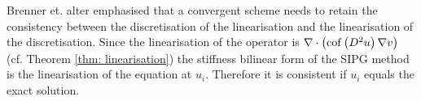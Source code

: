 Brenner et. alter emphasised that a convergent scheme needs to retain the consistency between the discretisation of the linearisation and the linearisation of the discretisation. Since the linearisation of the \MA operator is $\nabla \cdot \left( \operatorname{cof} \left( D^2 u \right) \nabla v \right)$ (cf. Theorem \ref{thm: linearisation}) the stiffness bilinear form of the SIPG method is the linearisation of the \MA equation at $u_i$. Therefore it is consistent if $u_i$ equals the exact solution. 
%
%
%
%
%
